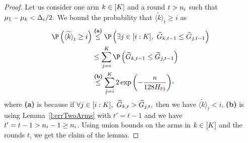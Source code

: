 \begin{proof}
Let us consider one arm  $k\in[K]$ and a round  
$t> n_{i}$ such that $\mu_1-\mu_k< \Delta_{i}/2.$ 
We bound the probability that $\tilde{\langle k \rangle}_t\geq i$ as
%
\begin{align*}
\Pro\left(\tilde{\langle k \rangle}_t\geq i\right)
&\stackrel{\textbf{(a)}}{\leq}
\Pro\left( \exists j \in [i:\nArms],~ \estCumulGainVector_{k,t-1}
\leq  \estCumulGainVector_{j,t-1} \right)\\
&\leq
\sum_{j=i}^{\nArms}
\Pro\left(\estCumulGainVector_{k,t-1}\leq  \estCumulGainVector_{j,t-1} \right)\\
&\stackrel{\textbf{(b)}}{\leq}
\sum_{j=i}^{\nArms}  2\exp\left(-\frac{\timeHorizon}{128\complexityProOne}\right)\!\CommaBin  
\end{align*} 
%
where \textbf{(a)} is because if $\forall j
 \in [i:K],~\widetilde{G}_{k,t}>  \widetilde{G}_{j,t},$
  then we have $\tilde{\langle k \rangle}_t< i$,
 \textbf{(b)} is using  Lemma~\ref{l:errTwoArms} with $t'=t-1$ and we have $t'=t-1>n_i-1\geq n_i$.
%
Using union bounds on the arms in  $k\in[K]$ and the rounds $t$, 
 we get the claim of the lemma.
\end{proof}%
%
	\setcounter{scratchcounter}{\value{theorem}}
\lightres*
\setcounter{theorem}{\the\numexpr\value{scratchcounter}}

